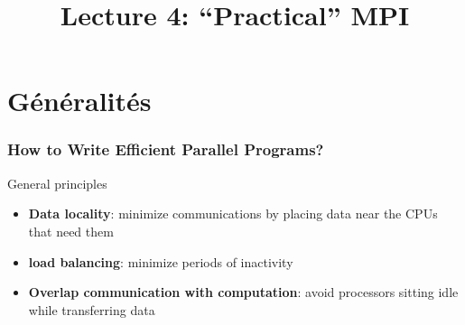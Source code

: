 \documentclass[xcolor={rgb,x11names,svgnames},rgb,x11names,svgnames]{beamer}
\title{Lecture 4: ``Practical'' MPI}
\begin{document}
\begin{frame}[label=title]
  \titlepage
\end{frame}


\section{Généralités}

\begin{frame}
\frametitle{How to Write Efficient Parallel Programs?}

\begin{block}{General principles}

\begin{itemize}
\item \textbf{Data locality}: minimize communications by placing data near the CPUs that need them

\medskip

\item \textbf{load balancing}: minimize periods of inactivity

\medskip

\item \textbf{Overlap communication with computation}: avoid processors sitting
  idle while transferring data
\end{itemize}
\end{block}

\end{frame}
\end{document}
